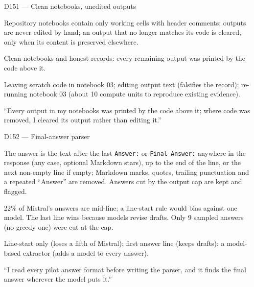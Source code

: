 \documentclass[11pt,a4paper]{report}
\begin{document}
\begin{decisionbox}{D151 --- Clean notebooks, unedited outputs}
\begin{description}[nosep, leftmargin=0pt]
  \item[Decision.] Repository notebooks contain only working cells with header comments; outputs are never edited by hand; an output that no longer matches its code is cleared, only when its content is preserved elsewhere.
  \item[Why.] Clean notebooks and honest records: every remaining output was printed by the code above it.
  \item[Alternatives.] Leaving scratch code in notebook 03; editing output text (falsifies the record); re-running notebook 03 (about 10 compute units to reproduce existing evidence).
  \item[Interview line.] ``Every output in my notebooks was printed by the code above it; where code was removed, I cleared its output rather than editing it.''
\end{description}
\end{decisionbox}
\begin{decisionbox}{D152 --- Final-answer parser}
\begin{description}[nosep, leftmargin=0pt]
  \item[Decision.] The answer is the text after the last \texttt{Answer:} or \texttt{Final Answer:} anywhere in the response (any case, optional Markdown stars), up to the end of the line, or the next non-empty line if empty; Markdown marks, quotes, trailing punctuation and a repeated ``Answer'' are removed. Answers cut by the output cap are kept and flagged.
  \item[Why.] 22\% of Mistral's answers are mid-line; a line-start rule would bias against one model. The last line wins because models revise drafts. Only 9 sampled answers (no greedy one) were cut at the cap.
  \item[Alternatives.] Line-start only (loses a fifth of Mistral); first answer line (keeps drafts); a model-based extractor (adds a model to every answer).
  \item[Interview line.] ``I read every pilot answer format before writing the parser, and it finds the final answer wherever the model puts it.''
\end{description}
\end{decisionbox}
\end{document}
